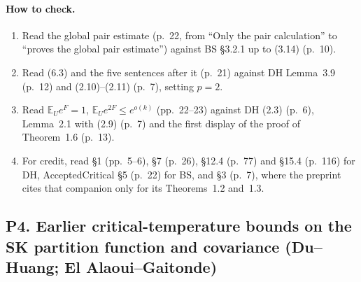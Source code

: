 \documentclass[11pt]{article}
\newcommand{\E}{\mathbb{E}}
\newcommand{\ploc}[2]{#1}
\begin{document}
\paragraph{How to check.}
\begin{enumerate}
\item Read the global pair estimate
 \ploc{(p.~22, from ``Only the pair calculation'' to ``proves the global pair
 estimate'')}{profile-spectral.tex:788--837} against BS \S3.2.1 up to (3.14)
 (p.~10).
\item Read \ploc{(6.3) and the five sentences after it (p.~21)}{profile-spectral.tex:712--730}
 against DH Lemma~3.9 (p.~12) and (2.10)--(2.11) (p.~7), setting $p=2$.
\item Read \ploc{$\E_Ue^F=1$, $\E_Ue^{2F}\le e^{o(k)}$ (pp.~22--23)}{profile-spectral.tex:841--848}
 against DH (2.3) (p.~6), Lemma~2.1 with (2.9) (p.~7) and the first display
 of the proof of Theorem~1.6 (p.~13).
\item For credit, read \ploc{\S1 (pp.~5--6)}{introduction.tex:198--210},
 \ploc{\S7 (p.~26)}{profile-spectral.tex:1133--1138},
 \ploc{\S12.4 (p.~77)}{profile-amplification.tex:928--935} and
 \ploc{\S15.4 (p.~116)}{cap-static.tex:294--297} for DH,
 \ploc{AcceptedCritical \S5 (p.~22)}{orientation.tex:12--18} for BS, and
 \ploc{\S3 (p.~7)}{accepted-inputs.tex:3--6}, where the preprint cites that
 companion only for its Theorems~1.2 and~1.3.
\end{enumerate}
\subsection{P4. Earlier critical-temperature bounds on the SK partition function and covariance (Du--Huang; El Alaoui--Gaitonde)}\label{f:P4}
\end{document}

